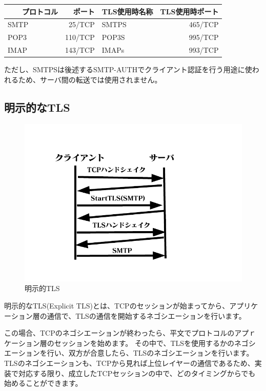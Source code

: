\begin{table}[htb]
  \begin{tabular}{lrlr} \hline
  　　プロトコル & ポート & TLS使用時名称 & TLS使用時ポート \\ \hline \hline
    SMTP & 25/TCP & SMTPS & 465/TCP \\
    POP3 & 110/TCP & POP3S & 995/TCP \\
    IMAP & 143/TCP & IMAPs & 993/TCP \\ \hline
  \end{tabular}
\end{table}

ただし、SMTPSは後述するSMTP-AUTHでクライアント認証を行う用途に使われるため、サーバ間の転送では使用されません。

\subsection{明示的なTLS}

\begin{figure}[htbp]
	\includegraphics[width=12cm,clip]{draw/explicit.pdf}
	\caption{明示的TLS}
	\label{fig:explicit_TLS}
\end{figure}

明示的なTLS(Explicit TLS)とは、TCPのセッションが始まってから、アプリケーション層の通信で、TLSの通信を開始するネゴシエーションを行います。

この場合、TCPのネゴシエーションが終わったら、平文でプロトコルのアプｒケーション層のセッションを始めます。
その中で、TLSを使用するかのネゴシエーションを行い、双方が合意したら、TLSのネゴシエーションを行います。
TLSのネゴシエーションも、TCPから見れば上位レイヤーの通信であるため、実装で対応する限り、成立したTCPセッションの中で、どのタイミングからでも始めることができます。


